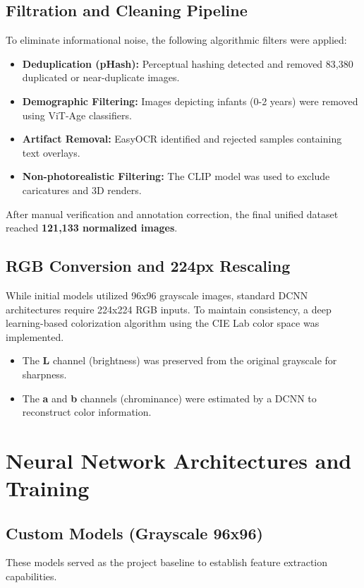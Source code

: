 \documentclass{article}
\begin{document}
\subsection{Filtration and Cleaning Pipeline}
To eliminate informational noise, the following algorithmic filters were applied:
\begin{itemize}
    \item \textbf{Deduplication (pHash):} Perceptual hashing detected and removed 83,380 duplicated or near-duplicate images.
    \item \textbf{Demographic Filtering:} Images depicting infants (0-2 years) were removed using ViT-Age classifiers.
    \item \textbf{Artifact Removal:} EasyOCR identified and rejected samples containing text overlays.
    \item \textbf{Non-photorealistic Filtering:} The CLIP model was used to exclude caricatures and 3D renders.
\end{itemize}
After manual verification and annotation correction, the final unified dataset reached \textbf{121,133 normalized images}.

\subsection{RGB Conversion and 224px Rescaling}
While initial models utilized 96x96 grayscale images, standard DCNN architectures require 224x224 RGB inputs. To maintain consistency, a deep learning-based colorization algorithm using the CIE Lab color space was implemented.
\begin{itemize}
    \item The \textbf{L} channel (brightness) was preserved from the original grayscale for sharpness.
    \item The \textbf{a} and \textbf{b} channels (chrominance) were estimated by a DCNN to reconstruct color information.
\end{itemize}

\section{Neural Network Architectures and Training}

\subsection{Custom Models (Grayscale 96x96)}
These models served as the project baseline to establish feature extraction capabilities.
\end{document}
